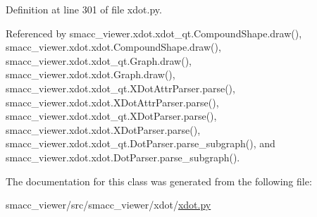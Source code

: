 Definition at line 301 of file xdot.\+py.



Referenced by smacc\+\_\+viewer.\+xdot.\+xdot\+\_\+qt.\+Compound\+Shape.\+draw(), smacc\+\_\+viewer.\+xdot.\+xdot.\+Compound\+Shape.\+draw(), smacc\+\_\+viewer.\+xdot.\+xdot\+\_\+qt.\+Graph.\+draw(), smacc\+\_\+viewer.\+xdot.\+xdot.\+Graph.\+draw(), smacc\+\_\+viewer.\+xdot.\+xdot\+\_\+qt.\+X\+Dot\+Attr\+Parser.\+parse(), smacc\+\_\+viewer.\+xdot.\+xdot.\+X\+Dot\+Attr\+Parser.\+parse(), smacc\+\_\+viewer.\+xdot.\+xdot\+\_\+qt.\+X\+Dot\+Parser.\+parse(), smacc\+\_\+viewer.\+xdot.\+xdot.\+X\+Dot\+Parser.\+parse(), smacc\+\_\+viewer.\+xdot.\+xdot\+\_\+qt.\+Dot\+Parser.\+parse\+\_\+subgraph(), and smacc\+\_\+viewer.\+xdot.\+xdot.\+Dot\+Parser.\+parse\+\_\+subgraph().



The documentation for this class was generated from the following file\+:\begin{DoxyCompactItemize}
\item 
smacc\+\_\+viewer/src/smacc\+\_\+viewer/xdot/\hyperlink{xdot_8py}{xdot.\+py}\end{DoxyCompactItemize}
